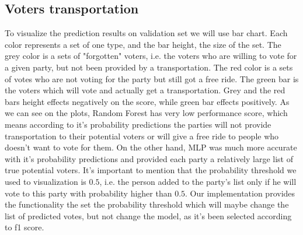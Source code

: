 \documentclass[12pt]{article}
\begin{document}
\subsection{Voters transportation}
To visualize the prediction results on validation set we will use bar chart. Each color represents a set of one type, and the bar height, the size of the set. The grey color is a sets of "forgotten" voters, i.e. the voters who are willing to vote for a given party, but not been provided by a transportation. The red color is a sets of votes who are not voting for the party but still got a free ride. The green bar is the voters which will vote and actually get a transportation. Grey and the red bars height effects negatively on the score, while green bar effects positively. As we can see on the plots, Random Forest has very low performance score, which means according to it's probability predictions the parties will not provide transportation to their potential voters or will give a free ride to people who doesn't want to vote for them. On the other hand, MLP was much more accurate with it's probability predictions and provided each party a relatively large list of true potential voters. It's important to mention that the probability threshold we used to visualization is $0.5$, i.e. the person added to the party's list only if he will vote to this party with probability higher than $0.5$. Our implementation provides the functionality the set the probability threshold which will maybe change the list of predicted votes, but not change the model, as it's been selected according to f1 score. 
\end{document}
